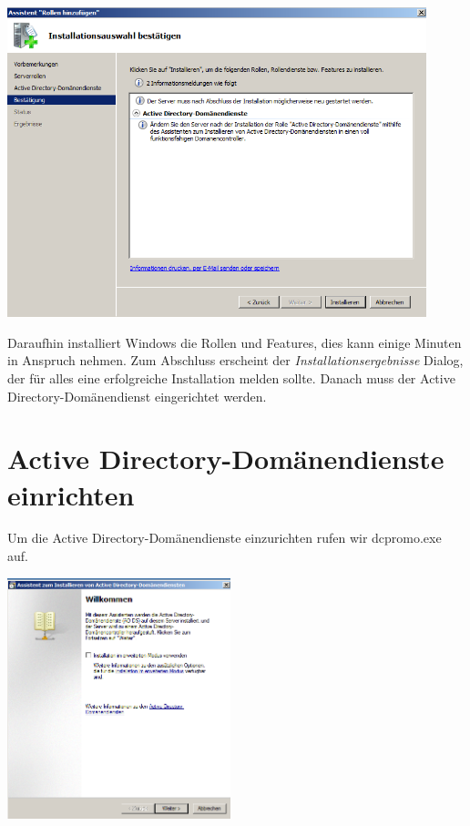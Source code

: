 \documentclass[12pt,a4paper,titlepage]{scrartcl} %
\begin{document}
 	\begin{center}\includegraphics[height=9cm]{Bilder/011}\\ \end{center}
 
Daraufhin installiert Windows die Rollen und Features, dies kann einige Minuten in Anspruch nehmen. Zum Abschluss erscheint der \emph{Installationsergebnisse} Dialog, der für alles eine erfolgreiche Installation melden sollte. Danach muss der Active Directory-Domänendienst eingerichtet werden.
 
 \newpage
 \section{Active Directory-Domänendienste einrichten}
Um die Active Directory-Domänendienste einzurichten rufen wir dcpromo.exe auf.\\

	\begin{center}\includegraphics[height=7cm]{Bilder/014(dcpromo_exe01)}\\ \end{center}
	
\end{document}
